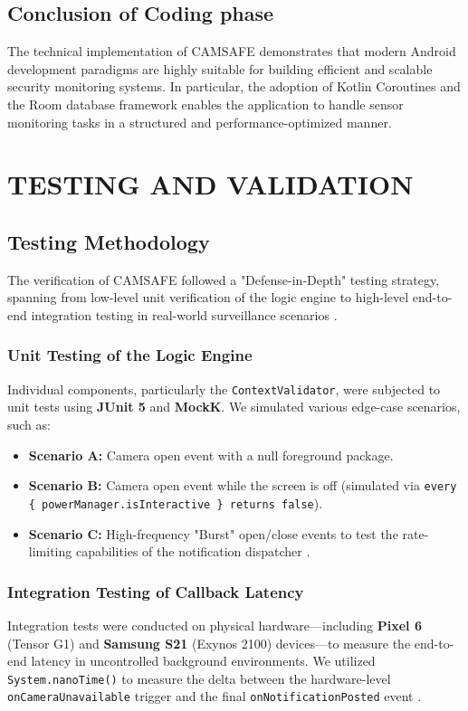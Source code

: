 \documentclass[12pt,a4paper]{report}
\begin{document}
\begin{enumerate}
\begin{itemize}
    \section{Conclusion of Coding phase}
   The technical implementation of CAMSAFE demonstrates that modern Android
development paradigms are highly suitable for building efficient and scalable
security monitoring systems. In particular, the adoption of Kotlin Coroutines
and the Room database framework \cite{smarthome} enables the application to
handle sensor monitoring tasks in a structured and performance-optimized
manner. 


    \chapter{TESTING AND VALIDATION}

    \section{Testing Methodology}
    The verification of CAMSAFE followed a "Defense-in-Depth" testing strategy, spanning from low-level unit verification of the logic engine to high-level end-to-end integration testing in real-world surveillance scenarios \cite{malwaresurvey}.

    \subsection{Unit Testing of the Logic Engine}
    Individual components, particularly the \texttt{ContextValidator}, were subjected to unit tests using \textbf{JUnit 5} and \textbf{MockK}. We simulated various edge-case scenarios, such as:
    \begin{itemize}
        \item \textbf{Scenario A:} Camera open event with a null foreground package.
        \item \textbf{Scenario B:} Camera open event while the screen is off (simulated via \texttt{every \{ powerManager.isInteractive \} returns false}).
        \item \textbf{Scenario C:} High-frequency "Burst" open/close events to test the rate-limiting capabilities of the notification dispatcher \cite{checkmarx}.
    \end{itemize}

    \subsection{Integration Testing of Callback Latency}
    Integration tests were conducted on physical hardware—including \textbf{Pixel 6} (Tensor G1) and \textbf{Samsung S21} (Exynos 2100) devices—to measure the end-to-end latency in uncontrolled background environments. We utilized \texttt{System.nanoTime()} to measure the delta between the hardware-level \texttt{onCameraUnavailable} trigger and the final \texttt{onNotificationPosted} event \cite{androidhal}.


\end{itemize}
\end{enumerate}
\end{document}
